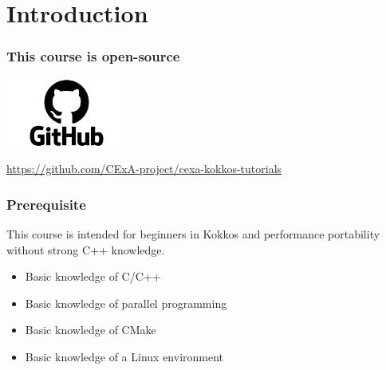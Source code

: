 \documentclass[aspectratio=169]{beamer}
\begin{document}

\section{Introduction}



\begin{frame}
    \frametitle{This course is open-source}
    
    \begin{center}

    \includegraphics[width=0.3\textwidth]{../../images/GitHub-logo.png}

    \href{https://github.com/CExA-project/cexa-kokkos-tutorials}{https://github.com/CExA-project/cexa-kokkos-tutorials}

    \end{center}
    
\end{frame}


\begin{frame}
\frametitle{Prerequisite}

This course is intended for beginners in Kokkos and performance portability without strong C++ knowledge. 

\begin{itemize}
    \item Basic knowledge of C/C++
    \item Basic knowledge of parallel programming
    \item Basic knowledge of CMake
    \item Basic knowledge of a Linux environment
\end{itemize}

\end{frame}
\end{document}
